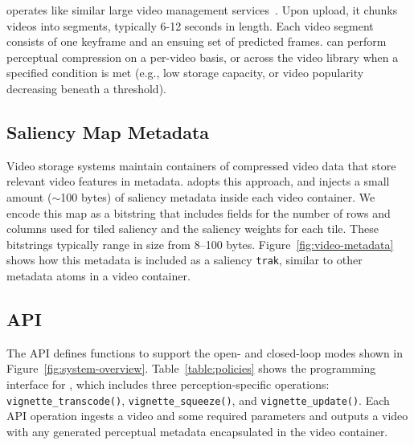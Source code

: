 \nameStore operates like similar large video management services~\cite{vbench, huang2017sve, netflix2018shotbased}.
Upon upload, it chunks videos into segments, typically 6-12 seconds in length.
Each video segment consists of one keyframe and an ensuing set of predicted frames.
\nameStore can perform perceptual compression on a per-video basis, or across the video library when a specified condition is met (e.g., low storage capacity, or video popularity decreasing beneath a threshold).

\subsection{Saliency Map Metadata}
\label{sec:system:metadata}

Video storage systems maintain containers of compressed video data that store relevant video features in metadata.
\nameStore adopts this approach, and injects a small amount ($\sim$100 bytes) of saliency metadata inside each video container.
We encode this map as a bitstring that includes fields for the number of rows and columns used for tiled saliency and the saliency weights for each tile.
These bitstrings typically range in size from 8--100 bytes.
Figure~\ref{fig:video-metadata} shows how this metadata is included as a saliency \texttt{trak}, similar to other metadata atoms in a video container.

\videoMetadataFigure

\subsection{\nameStore API}
\label{sec:system:interface}


The \nameStore API defines functions to support the open- and closed-loop modes shown in  Figure~\ref{fig:system-overview}.
Table~\ref{table:policies} shows the programming interface for \name, which includes three perception-specific operations: \texttt{vignette\_transcode()}, \texttt{vignette\_squeeze()}, and \texttt{vignette\_update()}.
Each API operation ingests a video and some required parameters and outputs a video with any generated perceptual metadata encapsulated in the video container.

